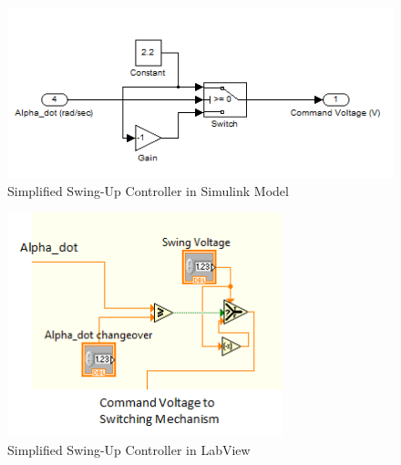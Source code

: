 \documentclass{article}
\theoremstyle{plain}
\theoremstyle{definition}
\theoremstyle{remark}
\begin{document}
\begin{figure}
\begin{center}
\includegraphics[width = 12cm]{Q9simulink.png}
\end{center}
\caption{Simplified Swing-Up Controller in Simulink Model}
\label{q9_3}
\end{figure}

\begin{figure}
\begin{center}
\includegraphics[width = 8cm]{Q9labview.png}
\end{center}
\caption{Simplified Swing-Up Controller in LabView}
\label{q9_4}
\end{figure}

\clearpage
\end{document}
